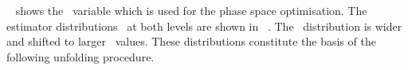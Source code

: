 %
\Fig~ shows the \ptlb\ variable which is used for the phase space optimisation. 
%
The estimator distributions \mlb\ at both levels are shown in \fig~. 
%
The \recolevel\ distribution is wider and shifted to larger \mlb\ values.
%
These distributions constitute the basis of the following unfolding procedure.























